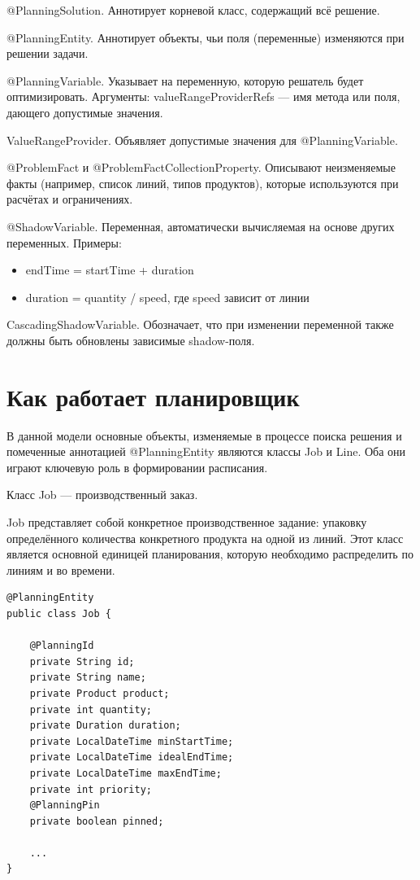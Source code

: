 @PlanningSolution. Аннотирует корневой класс, содержащий всё решение.

@PlanningEntity. Аннотирует объекты, чьи поля (переменные) изменяются при решении задачи.

@PlanningVariable. Указывает на переменную, которую решатель будет оптимизировать. Аргументы: valueRangeProviderRefs — имя метода или поля, дающего допустимые значения.

ValueRangeProvider. Объявляет допустимые значения для @PlanningVariable.

@ProblemFact и @ProblemFactCollectionProperty. Описывают неизменяемые факты (например, список линий, типов продуктов), которые используются при расчётах и ограничениях.

@ShadowVariable. Переменная, автоматически вычисляемая на основе других переменных. Примеры:
        \begin{itemize}
            \item endTime = startTime + duration
            \item duration = quantity / speed, где speed зависит от линии
        \end{itemize}

CascadingShadowVariable. Обозначает, что при изменении переменной также должны быть обновлены зависимые shadow-поля.

\section{Как работает планировщик}
 В данной модели основные объекты, изменяемые в процессе поиска решения и помеченные аннотацией @PlanningEntity являются классы Job и Line. Оба они играют ключевую роль в формировании расписания. \

 Класс Job — производственный заказ.

 Job представляет собой конкретное производственное задание: упаковку определённого количества конкретного продукта на одной из линий. Этот класс является основной единицей планирования, которую необходимо распределить по линиям и во времени. \

 \vspace{5cm}

 \begin{lstlisting}[caption={класс Job}, label={lst:classJob}]
@PlanningEntity
public class Job {

    @PlanningId
    private String id;
    private String name;
    private Product product;
    private int quantity;
    private Duration duration;
    private LocalDateTime minStartTime;
    private LocalDateTime idealEndTime;
    private LocalDateTime maxEndTime;
    private int priority;
    @PlanningPin
    private boolean pinned;

    ...
}
\end{lstlisting}

